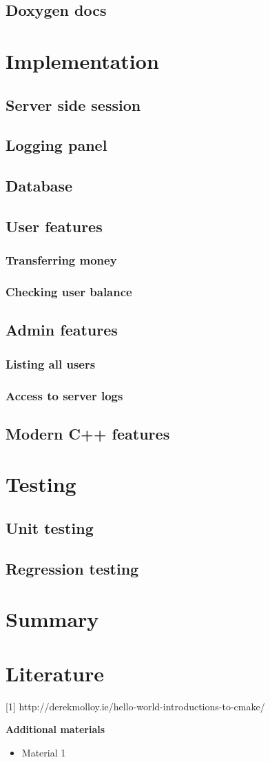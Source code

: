\documentclass[a4paper,12pt]{article}
\begin{document}
\subsection{Doxygen docs}

\section{Implementation}
\subsection{Server side session}
\subsection{Logging panel}
\subsection{Database}
\subsection{User features}
\subsubsection{Transferring money}
\subsubsection{Checking user balance}
\subsection{Admin features}
\subsubsection{Listing all users}
\subsubsection{Access to server logs}
\subsection{Modern C++ features}

\section{Testing}
\subsection{Unit testing}
\subsection{Regression testing}
\section{Summary}
\section{Literature}
[1] http://derekmolloy.ie/hello-world-introductions-to-cmake/
\bigskip

\textbf{Additional materials} \begin{itemize}
	\item Material 1
\end{itemize}
\newpage

\linespread{1.3}
\selectfont
\end{document}
